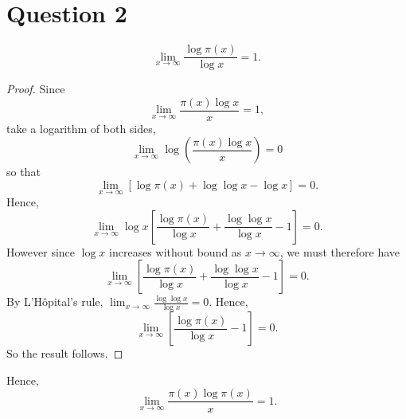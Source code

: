 \documentclass{unswmaths}
\begin{document}
\section*{Question 2}
    \begin{theorem}
    \label{q2a}
        \begin{equation*}
            \lim_{x\rightarrow\infty} \frac{\log{\pi(x)}}{\log{x}} = 1.
        \end{equation*}
    \end{theorem}
    \begin{proof}
        Since
        \begin{equation*}
            \lim_{x\rightarrow\infty} \frac{\pi(x)\log{x}}{x} = 1, 
        \end{equation*}
        take a logarithm of both sides,
        \begin{equation*}
            \lim_{x\rightarrow\infty} \log\left(\frac{\pi(x)\log{x}}{x}\right) = 0
        \end{equation*}
        so that
        \begin{equation*}
            \lim_{x\rightarrow\infty} [\log{\pi(x)}+\log{\log{x}}-\log{x}] = 0.
        \end{equation*}
        Hence,
        \begin{equation*}
            \lim_{x\rightarrow\infty} \log{x}\left[\frac{\log{\pi(x)}}{\log{x}}+\frac{\log{\log{x}}}{\log{x}}-1\right] = 0.
        \end{equation*}
        However since $\log{x}$ increases without bound as $x\rightarrow\infty$, we must therefore have
        \begin{equation*}
            \lim_{x\rightarrow\infty} \left[\frac{\log{\pi(x)}}{\log{x}}+\frac{\log{\log{x}}}{\log{x}}-1\right] = 0.
        \end{equation*}
        By L'H\^opital's rule, $\lim_{x\rightarrow\infty} \frac{\log{\log{x}}}{\log{x}} = 0$. 
        Hence,
        \begin{equation*}
            \lim_{x\rightarrow\infty} \left[\frac{\log{\pi(x)}}{\log{x}}-1\right] = 0.
        \end{equation*}
        So the result follows.
    \end{proof}
    \begin{lemma}
    \label{q2c}
        Hence,
        \begin{equation*}
            \lim_{x\rightarrow\infty} \frac{\pi(x)\log{\pi(x)}}{x} = 1.
        \end{equation*}
    \end{lemma}
\end{document}
